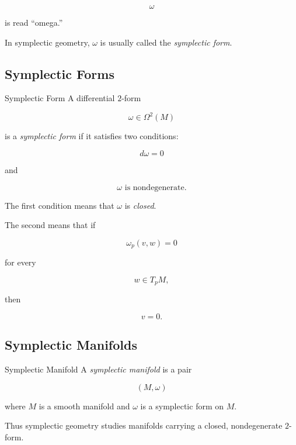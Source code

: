 \[
\omega
\]

is read ``omega.''

In symplectic geometry, \(\omega\) is usually called the
\emph{symplectic form}.

\subsection{Symplectic Forms}
\label{subsec:symplectic-forms}

\begin{definitionbox}{Symplectic Form}
A differential \(2\)-form

\[
\omega\in\Omega^2(M)
\]

is a \emph{symplectic form} if it satisfies two conditions:

\[
\boxed{d\omega=0}
\]

and

\[
\boxed{\omega\text{ is nondegenerate}.}
\]
\end{definitionbox}

The first condition means that \(\omega\) is \emph{closed}.

The second means that if

\[
\omega_p(v,w)=0
\]

for every

\[
w\in T_pM,
\]

then

\[
\boxed{v=0.}
\]

\subsection{Symplectic Manifolds}
\label{subsec:symplectic-manifolds}

\begin{definitionbox}{Symplectic Manifold}
A \emph{symplectic manifold} is a pair

\[
\boxed{(M,\omega)}
\]

where \(M\) is a smooth manifold and \(\omega\) is a symplectic form on
\(M\).
\end{definitionbox}

Thus symplectic geometry studies manifolds carrying a closed,
nondegenerate \(2\)-form.

